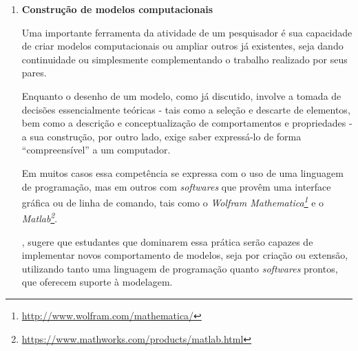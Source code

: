 \begin{enumerate}
  \item \textbf{Construção de modelos computacionais}

  Uma importante ferramenta da atividade de um pesquisador é sua capacidade de criar modelos computacionais ou ampliar outros já existentes, seja dando continuidade ou simplesmente complementando o trabalho realizado por seus pares. 

  Enquanto o desenho de um modelo, como já discutido, involve a tomada de decisões essencialmente teóricas - tais como a seleção e descarte de elementos, bem como a descrição e conceptualização de comportamentos e propriedades - a sua construção, por outro lado, exige saber expressá-lo de forma ``compreensível'' a um computador. 
  
  Em muitos casos essa competência se expressa com o uso de uma linguagem de programação, mas em outros com \textit{softwares} que provêm uma interface gráfica ou de linha de comando, tais como o \textit{Wolfram Mathematica\footnote{\href{http://www.wolfram.com/mathematica/}{http://www.wolfram.com/mathematica/} }} e o \textit{Matlab\footnote{\href{https://www.mathworks.com/products/matlab.html}{https://www.mathworks.com/products/matlab.html}}}.

  , sugere que estudantes que dominarem essa prática serão capazes de implementar novos comportamento de modelos, seja por criação ou extensão, utilizando tanto uma linguagem de programação quanto \textit{softwares} prontos, que oferecem suporte à modelagem.
\end{enumerate}
















